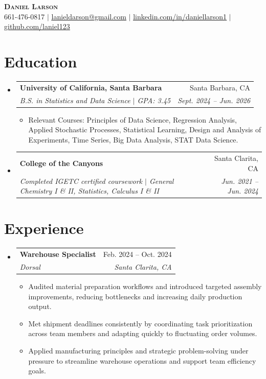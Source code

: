 \documentclass[letterpaper,11pt]{article}
\makeatletter
\newcommand{\resumeItem}[1]{
  \item\small{
    {#1 \vspace{-2pt}}
  }
}
\newcommand{\resumeSubheading}[4]{
  \vspace{-2pt}\item
    \begin{tabular*}{0.97\textwidth}[t]{l@{\extracolsep{\fill}}r}
      \textbf{#1} & #2 \\
      \textit{\small#3} & \textit{\small #4} \\
    \end{tabular*}\vspace{-7pt}
}
\newcommand{\resumeSubHeadingListStart}{\begin{itemize}[leftmargin=0.15in, label={}]}
\newcommand{\resumeSubHeadingListEnd}{\end{itemize}}
\newcommand{\resumeItemListStart}{\begin{itemize}}
\newcommand{\resumeItemListEnd}{\end{itemize}\vspace{-5pt}}
\makeatother
\begin{document}
 
\begin{center}
    \textbf{\fontsize{16}{18}\selectfont \scshape Daniel Larson} \\ \vspace{1pt}
    \small 661-476-0817 $|$ \href{mailto:lanieldarson@gmail.com}{\underline{lanieldarson@gmail.com}} $|$
    \href{https://www.linkedin.com/in/daniellarson1}{\underline{linkedin.com/in/daniellarson1}} $|$
    \href{https://github.com/laniel123}{\underline{github.com/laniel123}}
\end{center}
 
\section{Education}
  \resumeSubHeadingListStart
    \resumeSubheading
      {University of California, Santa Barbara}{Santa Barbara, CA}
      {B.S. in Statistics and Data Science $|$ GPA: 3.45}{Sept. 2024 -- Jun. 2026}
      \resumeItemListStart
        \resumeItem{Relevant Courses: Principles of Data Science, Regression Analysis, 
        Applied Stochastic Processes, Statistical Learning, Design and Analysis of Experiments, 
        Time Series, Big Data Analysis, STAT Data Science.}
      \resumeItemListEnd
      \resumeSubheading
      {College of the Canyons}{Santa Clarita, CA}
      {Completed IGETC certified coursework $|$ General Chemistry I \& II, Statistics, Calculus I \& II}{Jun. 2021 -- Jun. 2024}
      \resumeSubHeadingListEnd
      
\section{Experience}
  \resumeSubHeadingListStart
    \resumeSubheading
      {Warehouse Specialist}{Feb. 2024 -- Oct. 2024}
      {Dorsal}{Santa Clarita, CA}
      \resumeItemListStart
        \resumeItem{Audited material preparation workflows and introduced targeted assembly improvements, reducing bottlenecks and increasing daily production output.}
        \resumeItem{Met shipment deadlines consistently by coordinating task prioritization across team members and adapting quickly to fluctuating order volumes.}
        \resumeItem{Applied manufacturing principles and strategic problem-solving under pressure to streamline warehouse operations and support team efficiency goals.}
      \resumeItemListEnd
  \resumeSubHeadingListEnd

\end{document}
